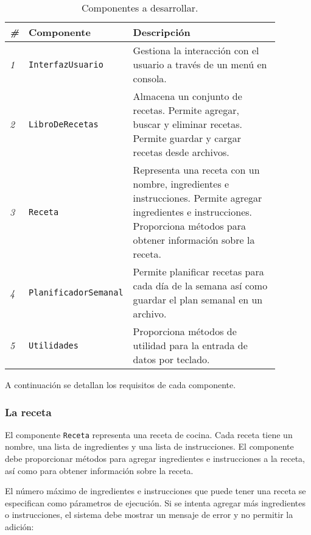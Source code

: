 \documentclass[
    a4paper, %
    12pt, %
]{CSSullivanBusinessReport}
\begin{document}
\begin{table*} %
    \caption{Componentes a desarrollar.}\label{tab:componentes-desarrollar}
    \begin{tabular}{C{0.03\linewidth} L{0.3\linewidth} L{0.55\linewidth}}
        \toprule
        \textit{\#} & \textbf{Componente} & \textbf{Descripción} \\
        \midrule
        \textit{1} & \texttt{InterfazUsuario} & Gestiona la interacción con el usuario a través de un menú en consola.\\
        \textit{2} & \texttt{LibroDeRecetas} & Almacena un conjunto de recetas. Permite agregar, buscar y eliminar recetas. Permite guardar y cargar recetas desde archivos.\\
        \textit{3} & \texttt{Receta} & Representa una receta con un nombre, ingredientes e instrucciones. Permite agregar ingredientes e instrucciones. Proporciona métodos para obtener información sobre la receta.\\
        \textit{4} & \texttt{PlanificadorSemanal} & Permite planificar recetas para cada día de la semana así como guardar el plan semanal en un archivo.\\
        \textit{5} & \texttt{Utilidades} & Proporciona métodos de utilidad para la entrada de datos por teclado.\\
        \bottomrule
    \end{tabular}
\end{table*}

A continuación se detallan los requisitos de cada componente.

\subsubsection{La receta}\label{sec:receta}

El componente \texttt{Receta} representa una receta de cocina. Cada receta tiene un nombre, una lista de ingredientes y una lista de instrucciones. El componente debe proporcionar métodos para agregar ingredientes e instrucciones a la receta, así como para obtener información sobre la receta.

El número máximo de ingredientes e instrucciones que puede tener una receta se especifican como párametros de ejecución. Si se intenta agregar más ingredientes o instrucciones, el sistema debe mostrar un mensaje de error y no permitir la adición:
\end{document}
